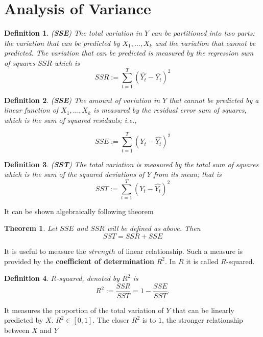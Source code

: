 \documentclass{book}
\newtheorem{definition}{Definition}[section]
\newtheorem{theorem}{Theorem}[section]
\begin{document}
\section{Analysis of Variance}
\begin{definition}(\textbf{SSE})
The total variation in $Y$ can be partitioned into two parts: the variation that can be predicted by $X_{1},\dots,X_{k}$ and the variation that cannot be predicted. The variation that can be predicted is measured by the regression sum of squares $SSR$ which is 
$$
SSR:=\sum_{t=1}^{T}(\hat{Y_{t}}-\bar{Y_{t}})^{2}
$$ 
\end{definition}

\begin{definition}(\textbf{SSE})
The amount of variation in $Y$ that cannot be predicted by a linear function of $X_{1},\dots,X_{k}$ is measured by the residual error sum of squares, which is the sum of squared residuals; i.e.,

\begin{equation}
SSE:=\sum_{t=1}^{T}(Y_{t}-\hat{Y_{t}})^{2}
\end{equation}
\end{definition}
\begin{definition}(\textbf{SST})
The total variation is measured by the total sum of squares which is the sum of the squared deviations of $Y$ from its mean; that is
$$
SST:=\sum_{t=1}^{T}(Y_{t}-\hat{Y_{t}})^{2}
$$ 
\end{definition}
It can be shown algebraically following theorem
\begin{theorem}
Let $SSE$ and $SSR$ will be defined as above. Then 
$$
SST=SSR+SSE
$$
\end{theorem}
It is useful to measure the $strength$ of linear relationship. Such a measure is provided by the \textbf{coefficient of determination} $R^{2}$. In $R$ it is called $R$-squared.
\begin{definition}
$R$-squared, denoted by $R^{2}$ is
$$
R^{2}:=\frac{SSR}{SST}=1-\frac{SSE}{SST}.
$$
\end{definition}
It measures the proportion of the total variation of $Y$ that can be linearly predicted by $X$.
$R^{2}\in[0,1]$. The closer $R^{2}$ is to $1$, the stronger relationship between $X$ and $Y$
\end{document}
